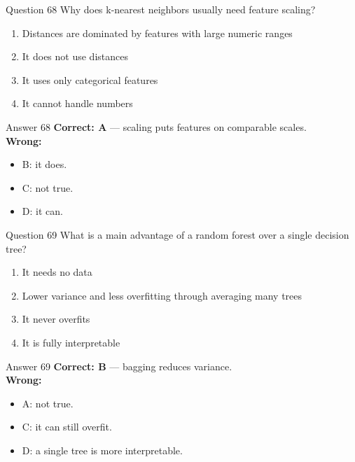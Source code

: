 \documentclass[aspectratio=169,11pt]{beamer}
\begin{document}
\begin{frame}{Question 68}
Why does k-nearest neighbors usually need feature scaling?
\begin{enumerate}[label=\Alph*.]
\item Distances are dominated by features with large numeric ranges
\item It does not use distances
\item It uses only categorical features
\item It cannot handle numbers
\end{enumerate}
\end{frame}
\begin{frame}{Answer 68}
\textbf{Correct: A} --- scaling puts features on comparable scales.\\
\vspace{0.5em}
\textbf{Wrong:}
\begin{itemize}
\item B: it does.
\item C: not true.
\item D: it can.
\end{itemize}
\end{frame}

\begin{frame}{Question 69}
What is a main advantage of a random forest over a single decision tree?
\begin{enumerate}[label=\Alph*.]
\item It needs no data
\item Lower variance and less overfitting through averaging many trees
\item It never overfits
\item It is fully interpretable
\end{enumerate}
\end{frame}
\begin{frame}{Answer 69}
\textbf{Correct: B} --- bagging reduces variance.\\
\vspace{0.5em}
\textbf{Wrong:}
\begin{itemize}
\item A: not true.
\item C: it can still overfit.
\item D: a single tree is more interpretable.
\end{itemize}
\end{frame}
\end{document}
